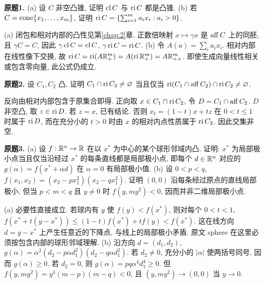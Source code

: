 \begin{exercise}\label{ass:6253-hw2-q1}
\textbf{原题1.} (a) 设 $C$ 非空凸锥, 证明 $\operatorname{cl} C$ 与 $\operatorname{ri} C$ 都是凸锥.
(b) 若 $C=\operatorname{cone}\{x_1,\ldots,x_m\}$, 证明
$\operatorname{ri} C=\{\sum_{i=1}^m a_ix_i:a_i>0\}$.
\end{exercise}
\begin{solution}
(a) 闭包和相对内部的凸性见第\ref{chap:2}章. 正数倍映射 $x\mapsto\gamma x$ 是 $\operatorname{aff} C$ 上的同胚, 且 $\gamma C=C$, 因此 $\gamma\operatorname{cl} C=\operatorname{cl} C$, $\gamma\operatorname{ri} C=\operatorname{ri} C$.
(b) 令 $A(a)=\sum_i a_i x_i$. 相对内部在线性像下交换, 故
$\operatorname{ri} C=\operatorname{ri}(A\mathbb R_+^m)=A(\operatorname{ri}\mathbb R_+^m)=A\mathbb R_{++}^m$. 即使生成向量线性相关或包含零向量, 此公式仍成立.
\end{solution}

\begin{exercise}\label{ass:6253-hw2-q2}
\textbf{原题2.} 设 $C_1,C_2$ 凸, 证明
$C_1\cap\operatorname{ri} C_2\ne\varnothing$ 当且仅当
$\operatorname{ri}(C_1\cap\operatorname{aff} C_2)\cap\operatorname{ri} C_2\ne\varnothing$.
\end{exercise}
\begin{solution}
反向由相对内部包含于原集合即得. 正向取 $x\in C_1\cap\operatorname{ri} C_2$, 令 $D=C_1\cap\operatorname{aff} C_2$. $D$ 非空凸, 取 $z\in\operatorname{ri} D$. 若 $z=x$, 已有结论. 否则 $x_t=(1-t)x+tz$ 在 $0<t\le1$ 时属于 $\operatorname{ri} D$, 而在充分小的 $t>0$ 时由 $x$ 的相对内点性质属于 $\operatorname{ri} C_2$. 因此交集非空.
\end{solution}

\begin{exercise}\label{ass:6253-hw2-q3}
\textbf{原题3.} (a) 设 $f:\mathbb R^n\to\mathbb R$ 在以 $x^*$ 为中心的某个球形邻域内凸. 证明: $x^*$ 为局部极小点当且仅当沿经过 $x^*$ 的每条直线都是局部极小点, 即每个 $d\in\mathbb R^n$ 对应的 $g(\alpha)=f(x^*+\alpha d)$ 在 $\alpha=0$ 有局部极小值.
(b) 设 $0<p<q$, $f(x_1,x_2)=(x_2-px_1^2)(x_2-qx_1^2)$. 证明 $(0,0)$ 沿每条经过原点的直线局部极小, 但当 $p<m<q$ 且 $y\ne0$ 时 $f(y,my^2)<0$, 因而并非二维局部极小点.
\end{exercise}
\begin{solution}
(a) 必要性直接成立. 若球内有 $y$ 使 $f(y)<f(x^*)$, 则对每个 $0<t<1$,
$f(x^*+t(y-x^*))\le(1-t)f(x^*)+tf(y)<f(x^*)$.
这在线方向 $d=y-x^*$ 上产生任意近的下降点, 与线上的局部极小矛盾. 原文 sphere 在这里必须按包含内部的球形邻域理解.
(b) 沿方向 $d=(d_1,d_2)$,
$g(\alpha)=\alpha^2(d_2-p\alpha d_1^2)(d_2-q\alpha d_1^2)$.
若 $d_2\ne0$, 充分小的 $|\alpha|$ 使两括号同号, 因而 $g(\alpha)\ge0$. 若 $d_2=0$, 则 $g(\alpha)=pq\alpha^4d_1^4\ge0$. 但 $f(y,my^2)=y^4(m-p)(m-q)<0$, 且 $(y,my^2)\to(0,0)$ 当 $y\to0$.
\end{solution}

